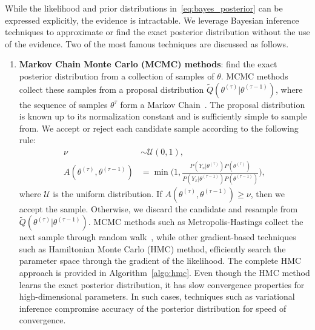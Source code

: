 While the likelihood and prior distributions in~\eqref{eq:bayes_posterior} can
be expressed explicitly, the evidence is intractable. We leverage Bayesian
inference techniques to approximate or find the exact posterior distribution
without the use of the evidence. Two of the most famous techniques are
discussed as follows.
\begin{enumerate}
  \item \textbf{Markov Chain Monte Carlo (MCMC) methods}: find the exact
  posterior distribution from a collection of samples of $\theta$.
  MCMC methods collect these samples from a proposal distribution
  $\tilde{Q}(\theta^{(\tau)} | \theta^{(\tau-1)})$, where the sequence of
  samples $\theta^\tau$ form a Markov Chain~\cite{bishop2006pattern}.
  The proposal distribution is known up to its normalization constant and is
  sufficiently simple to sample from. 
  We accept or reject each candidate sample according to the following rule:
  \begin{align*}
    \nu &\sim \mathcal{U}(0, 1), \\
    A(\theta^{(\tau)}, \theta^{(\tau-1)}) &= \min \Biggl(1, \frac{P(Y_x | \theta^{(\tau)})P(\theta^{(\tau)})}{P(Y_x | \theta^{(\tau-1)})P(\theta^{(\tau-1)})} \Biggr),
  \end{align*}
  \noindent where $\mathcal{U}$ is the uniform distribution. If
  $A(\theta^{(\tau)}, \theta^{(\tau-1)}) \geq \nu$, then we accept the sample. 
  Otherwise, we discard the candidate and resample from $\tilde{Q}(\theta^{(\tau)} |
  \theta^{(\tau-1)})$.
  MCMC methods such as Metropolis-Hastings collect the next sample through
  random walk~\cite{gilks1995markov}, while other gradient-based techniques such
  as Hamiltonian Monte Carlo (HMC) method, efficiently search the
  parameter space through the gradient of the likelihood.
  The complete HMC approach is provided in Algorithm~\eqref{algo:hmc}.
  Even though the HMC method learns the exact posterior distribution, it has
  slow convergence properties for high-dimensional parameters. In such cases,
  techniques such as variational inference compromise accuracy of the posterior
  distribution for speed of convergence.
  

\end{enumerate}
